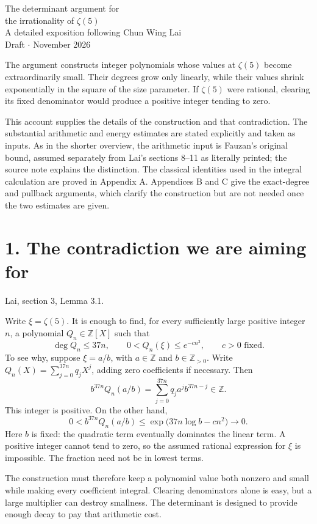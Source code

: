 \documentclass[11pt]{article}
\newcommand{\Z}{\mathbb Z}
\newcommand{\source}[1]{{\small\color{blue!45!black}#1}\par}
\newcommand{\heading}[2]{\section*{#1}\source{#2}}
\begin{document}
\begin{center}
{\LARGE The determinant argument for\\[3pt]
the irrationality of $\zeta(5)$}\\[9pt]
{\large A detailed exposition following Chun Wing Lai}\\[5pt]
Draft \enspace$\cdot$ November 2026
\end{center}

The argument constructs integer polynomials whose values at $\zeta(5)$
become extraordinarily small. Their degrees grow only linearly, while
their values shrink exponentially in the square of the size parameter.
If $\zeta(5)$ were rational, clearing its fixed denominator would produce
a positive integer tending to zero.

This account supplies the details of the construction and that contradiction.
The substantial arithmetic and energy estimates are stated explicitly and
taken as inputs. As in the shorter overview, the arithmetic input is
Fauzan's original bound, assumed separately from Lai's sections 8--11 as
literally printed; the source note explains the distinction. The classical
identities used in the integral calculation are proved in Appendix A.
Appendices B and C give the exact-degree and pullback arguments, which
clarify the construction but are not needed once the two estimates are given.

\heading{1. The contradiction we are aiming for}{Lai, section 3, Lemma 3.1.}
Write $\xi=\zeta(5)$. It is enough to find, for every sufficiently large
positive integer $n$, a polynomial $Q_n\in\Z[X]$ such that
\[
 \deg Q_n\leq37n,\qquad 0<Q_n(\xi)\leq e^{-cn^2},
 \qquad c>0\text{ fixed}.
\]
To see why, suppose $\xi=a/b$, with $a\in\Z$ and $b\in\Z_{>0}$.
Write $Q_n(X)=\sum_{j=0}^{37n}q_jX^j$, adding zero coefficients if necessary.
Then
\[
 b^{37n}Q_n(a/b)=\sum_{j=0}^{37n}q_j a^j b^{37n-j}\in\Z.
\]
This integer is positive. On the other hand,
\[
 0<b^{37n}Q_n(a/b)
 \leq\exp\bigl(37n\log b-cn^2\bigr)\longrightarrow0.
\]
Here $b$ is fixed: the quadratic term eventually dominates the linear term.
A positive integer cannot tend to zero, so the assumed rational expression
for $\xi$ is impossible. The fraction need not be in lowest terms.

The construction must therefore keep a polynomial value both nonzero and
small while making every coefficient integral. Clearing denominators alone
is easy, but a large multiplier can destroy smallness. The determinant is
designed to provide enough decay to pay that arithmetic cost.
\end{document}
